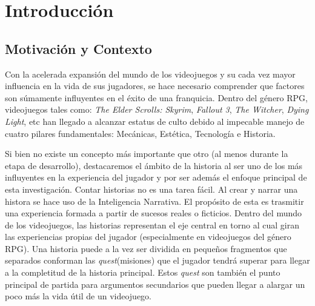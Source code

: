 \chapter{Introducción}



\section{Motivación y Contexto}


Con la acelerada expansión del mundo de los videojuegos y su cada vez mayor influencia en la vida de sus jugadores, se hace necesario comprender que factores son súmamente influyentes en el éxito de una franquicia. Dentro del género \ac{RPG}, videojuegos tales como: \textit{The Elder Scrolls: Skyrim}, \textit{Fallout 3}, \textit{The Witcher}, \textit{Dying Light}, etc han llegado a alcanzar estatus de culto debido al impecable manejo de cuatro pilares fundamentales: Mecánicas, Estética, Tecnología e Historia. 

Si bien no existe un concepto más importante que otro (al menos durante la etapa de desarrollo), destacaremos el ámbito de la historia al ser uno de los más influyentes en la experiencia del jugador y por ser además el enfoque principal de esta investigación. Contar historias no es una tarea fácil. Al crear y narrar una histora se hace uso de la Inteligencia Narrativa. El propósito de esta es trasmitir una experiencia formada a partir de sucesos reales o ficticios. Dentro del mundo de los videojuegos, las historias representan el eje central en torno al cual giran las experiencias propias del jugador (especialmente en videojuegos del género \ac{RPG}). Una historia puede a la vez ser dividida en pequeños fragmentos que separados conforman las \textit{quest}(misiones) que el jugador tendrá superar para llegar a la completitud de la historia principal. Estos \textit{quest} son también el punto principal de partida para argumentos secundarios que pueden llegar a alargar un poco más la vida útil de un videojuego. 

